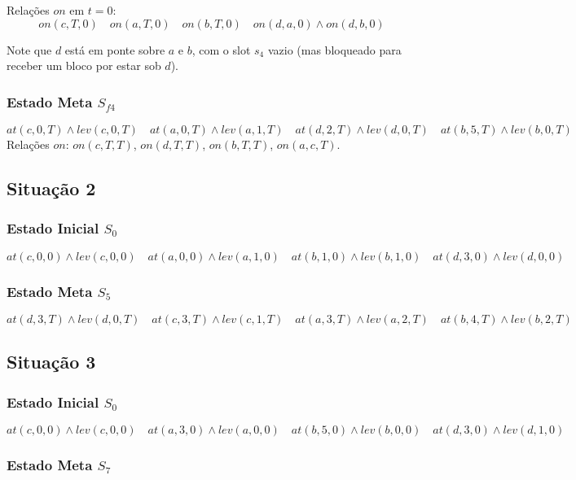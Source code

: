 \documentclass[12pt,a4paper]{article}
\begin{document}
Relações $on$ em $t=0$:
\[
on(c,T,0) \quad on(a,T,0) \quad on(b,T,0) \quad on(d,a,0) \wedge on(d,b,0)
\]

Note que $d$ está em ponte sobre $a$ e $b$, com o slot $s_4$ vazio (mas bloqueado para receber um bloco por estar sob $d$).

\subsubsection{Estado Meta $S_{f4}$}

\[
at(c,0,T) \wedge lev(c,0,T) \quad at(a,0,T) \wedge lev(a,1,T) \quad at(d,2,T) \wedge lev(d,0,T) \quad at(b,5,T) \wedge lev(b,0,T)
\]
Relações $on$: $on(c,T,T)$, $on(d,T,T)$, $on(b,T,T)$, $on(a,c,T)$.

\subsection{Situação 2}

\subsubsection{Estado Inicial $S_0$}

\[
at(c,0,0) \wedge lev(c,0,0) \quad at(a,0,0) \wedge lev(a,1,0) \quad at(b,1,0) \wedge lev(b,1,0) \quad at(d,3,0) \wedge lev(d,0,0)
\]

\subsubsection{Estado Meta $S_5$}

\[
at(d,3,T) \wedge lev(d,0,T) \quad at(c,3,T) \wedge lev(c,1,T) \quad at(a,3,T) \wedge lev(a,2,T) \quad at(b,4,T) \wedge lev(b,2,T)
\]

\subsection{Situação 3}

\subsubsection{Estado Inicial $S_0$}

\[
at(c,0,0) \wedge lev(c,0,0) \quad at(a,3,0) \wedge lev(a,0,0) \quad at(b,5,0) \wedge lev(b,0,0) \quad at(d,3,0) \wedge lev(d,1,0)
\]

\subsubsection{Estado Meta $S_7$}
\end{document}
